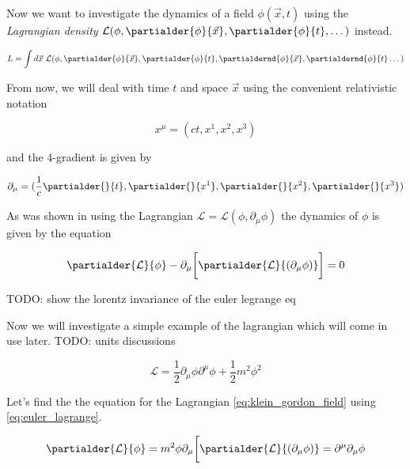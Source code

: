 Now we want to investigate the dynamics of a field $\phi(\vec{x}, t)$ using the \textit{Lagrangian density}
$\mathcal{L}(\phi, \partialder{\phi}{\vec{x}}, \partialder{\phi}{t}, \dots)$ instead.

\begin{equation}
    \label{eq:lagrangian_density}
    L = \int d\vec{x} \ \mathcal{L}(\phi, \partialder{\phi}{\vec{x}}, \partialder{\phi}{t}, \partialdernd{\phi}{\vec{x}}, \partialdernd{\phi}{t} \dots)
\end{equation}

From now, we will deal with time $t$ and space $\vec{x}$ using the convenient relativistic notation

\begin{equation*}
    x^{\mu} = (ct, x^{1}, x^{2}, x^{3})
\end{equation*}
    
and the 4-gradient is given by 

\begin{equation*}
    \partial_{\mu} = (\frac{1}{c} \partialder{}{t}, \partialder{}{x^{1}}, \partialder{}{x^{2}}, \partialder{}{x^{3}})
\end{equation*}

As was shown in \cite{goldstein} using the Lagrangian $\mathcal{L} = \mathcal{L}(\phi, \partial_{\mu} \phi)$ the dynamics of $\phi$ is given 
by the equation

\begin{equation}
    \label{eq:euler_lagrange}
    \partialder{\mathcal{L}}{\phi} - \partial_{\mu} \bigg[ \partialder{\mathcal{L}}{(\partial_{\mu} \phi)} \bigg] = 0
\end{equation}

TODO: show the lorentz invariance of the euler legrange eq

Now we will investigate a simple example of the lagrangian which will come in use later. TODO: units discussions

\begin{equation}
    \label{eq:klein_gordon_field}
    \mathcal{L} = \frac{1}{2} \partial_{\mu} \phi \partial^{\mu} \phi + \frac{1}{2} m^{2} \phi^{2}
\end{equation}

Let's find the the equation for the Lagrangian \ref{eq:klein_gordon_field} using \ref{eq:euler_lagrange}.

\begin{equation*}
    \begin{gathered}
        \partialder{\mathcal{L}}{\phi} = m^2 \phi
        \partial_{\mu} \bigg[ \partialder{\mathcal{L}}{(\partial_{\mu} \phi)} = \partial^{\mu} \partial_{\mu} \phi
    \end{gathered}
\end{equation*}

